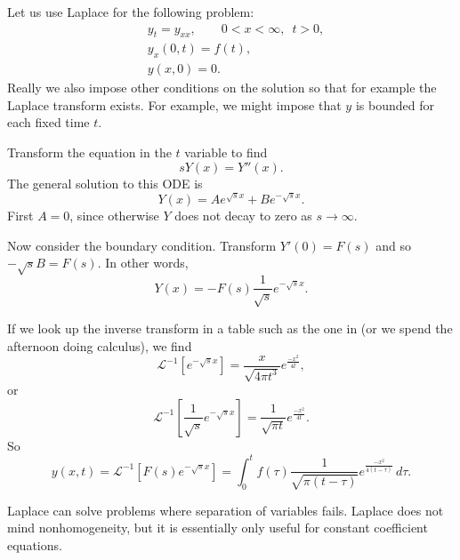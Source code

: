 \begin{example}
Let us use Laplace for the following problem:
\begin{align*}
& y_t = y_{xx}, \qquad 0 < x < \infty, \enspace t > 0,\\
& y_x(0,t) = f(t), \\
& y(x,0) = 0 .
\end{align*}
Really we also impose other conditions on the solution so that for example
the Laplace transform exists.  For example, we might impose that $y$ is
bounded for each fixed time $t$.

Transform the equation in the $t$ variable to find
\begin{equation*}
sY(x) = Y''(x) .
\end{equation*}
The general solution to this ODE is
\begin{equation*}
Y(x) = A e^{\sqrt{s}x} + B e^{-\sqrt{s} x} .
\end{equation*}
First $A=0$, since otherwise $Y$ does not decay to zero as $s \to \infty$.

Now consider the boundary condition.
Transform $Y'(0) = F(s)$ and so $-\sqrt{s}B = F(s)$.
In other words,
\begin{equation*}
Y(x) = - F(s) \frac{1}{\sqrt{s}} e^{-\sqrt{s} x} .
\end{equation*}

If we look up the inverse transform in a table such as the one in
 (or we spend the afternoon
doing calculus), we find 
\begin{equation*}
{\mathcal L}^{-1}\left[e^{-\sqrt{s} x}\right] =
\frac{x}{\sqrt{4\pi t^3}} e^{\frac{-x^2}{4t}} ,
\end{equation*}
or
\begin{equation*}
{\mathcal L}^{-1}\left[\frac{1}{\sqrt{s}} e^{-\sqrt{s} x}\right] =
\frac{1}{\sqrt{\pi t}} e^{\frac{-x^2}{4t}} .
\end{equation*}
So
\begin{equation*}
y(x,t) =
{\mathcal L}^{-1} \left[
F(s) e^{-\sqrt{s} x}\right]
=
\int_0^t
f(\tau) 
\frac{1}{\sqrt{\pi {(t-\tau)}}} e^{\frac{-x^2}{4(t-\tau)}} \, d\tau .
\end{equation*}
\end{example}

Laplace can solve problems where separation of variables fails.
Laplace does not mind nonhomogeneity, but it is essentially only useful for
constant coefficient equations.

